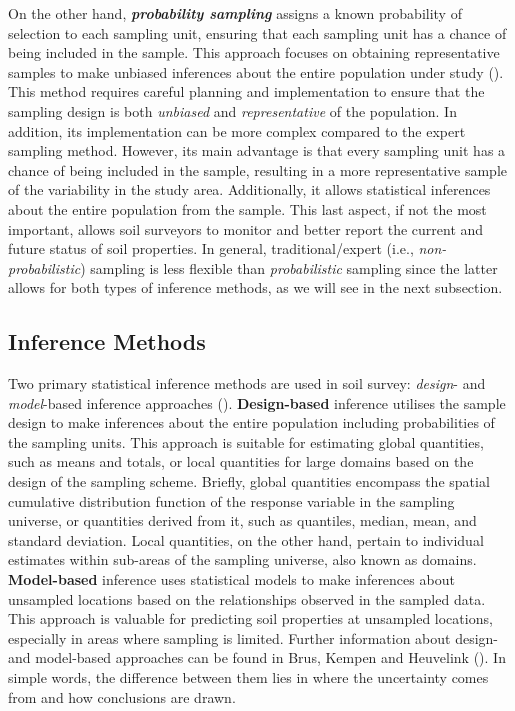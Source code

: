 \documentclass[
  10pt,
  b5paper,
  oneside]{book}
\begin{document}
On the other hand, \textbf{\emph{probability sampling}} assigns a known probability of selection to each sampling unit, ensuring that each sampling unit has a chance of being included in the sample. This approach focuses on obtaining representative samples to make unbiased inferences about the entire population under study (). This method requires careful planning and implementation to ensure that the sampling design is both \emph{unbiased} and \emph{representative} of the population. In addition, its implementation can be more complex compared to the expert sampling method. However, its main advantage is that every sampling unit has a chance of being included in the sample, resulting in a more representative sample of the variability in the study area. Additionally, it allows statistical inferences about the entire population from the sample. This last aspect, if not the most important, allows soil surveyors to monitor and better report the current and future status of soil properties. In general, traditional/expert (i.e., \emph{non-probabilistic}) sampling is less flexible than \emph{probabilistic} sampling since the latter allows for both types of inference methods, as we will see in the next subsection.

\subsection{Inference Methods}\label{inference-methods}

Two primary statistical inference methods are used in soil survey: \emph{design}- and \emph{model}-based inference approaches (). \textbf{Design-based} inference utilises the sample design to make inferences about the entire population including probabilities of the sampling units. This approach is suitable for estimating global quantities, such as means and totals, or local quantities for large domains based on the design of the sampling scheme. Briefly, global quantities encompass the spatial cumulative distribution function of the response variable in the sampling universe, or quantities derived from it, such as quantiles, median, mean, and standard deviation. Local quantities, on the other hand, pertain to individual estimates within sub-areas of the sampling universe, also known as domains. \textbf{Model-based} inference uses statistical models to make inferences about unsampled locations based on the relationships observed in the sampled data. This approach is valuable for predicting soil properties at unsampled locations, especially in areas where sampling is limited. Further information about design- and model-based approaches can be found in Brus, Kempen and Heuvelink (). In simple words, the difference between them lies in where the uncertainty comes from and how conclusions are drawn.
\end{document}
